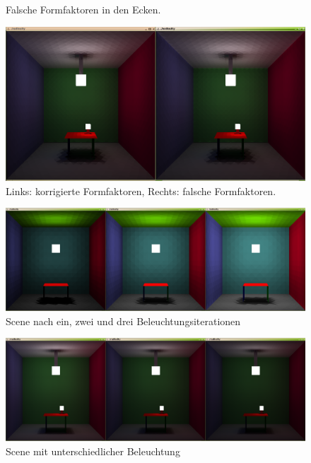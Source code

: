 \documentclass[final,a4paper,11pt,notitlepage,halfparskip]{scrreprt}
\begin{document}
\begin{appendix}
\begin{figure}[htb]
    \caption{Falsche Formfaktoren in den Ecken.}
    \label{fig:ff_corner}
  \end{figure}
  \begin{figure}[htb]
    \centering
    \includegraphics[width=12cm]{img/correct_ff.png}
    \caption{Links: korrigierte Formfaktoren, Rechts: falsche
    Formfaktoren.}
    \label{fig:ff_correct}
  \end{figure}
  \begin{figure}[htb]
    \centering
    \includegraphics[width=12cm]{img/iter.png}
    \caption{Scene nach ein, zwei und drei Beleuchtungsiterationen}
    \label{fig:iter}
  \end{figure}
  \begin{figure}[htb]
    \centering
    \includegraphics[width=12cm]{img/light.png}
    \caption{Scene mit unterschiedlicher Beleuchtung}
    \label{fig:light}
  \end{figure}
  \begin{figure}[htb]
    \centering

\end{figure}
\end{appendix}
\end{document}
